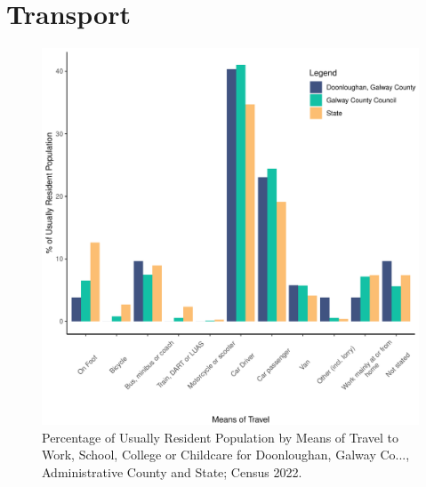 \documentclass{article}
\begin{document}
\section{Transport}\label{sect:Trans}
\begin{figure}[H]
	\centering
	\includegraphics[width = 120mm]{../figures/TravelED.pdf}
	\caption{Percentage of Usually Resident Population by Means of Travel to Work, School, College or Childcare for Doonloughan, Galway Co..., Administrative County and State; Census 2022.}
	\label{fig:vbnv}
	\end{figure}
\end{document}

